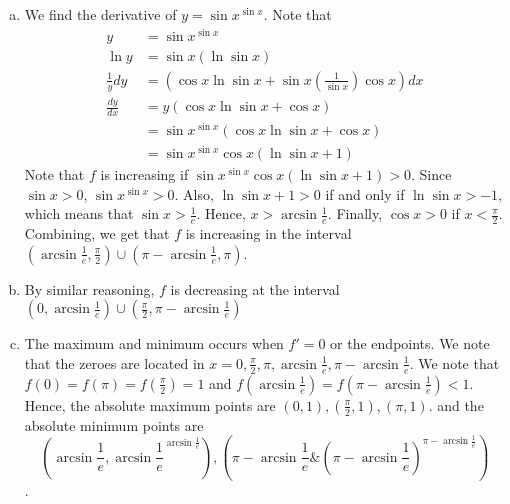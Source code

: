 \documentclass[12pt,a4paper]{article}
\begin{document}
\begin{enumerate}[a.]
    \item We find the derivative of $y = \sin{x}^{\sin{x}}$. 
    Note that \begin{align*}
        y &= \sin{x}^{\sin{x}} \\
        \ln{y} &= \sin{x} (\ln{\sin{x}}) \\
        \frac{1}{y} dy &= (\cos{x} \ln{\sin{x}}+ \sin{x}\left( \frac{1}{\sin{x}} \right) \cos{x}) dx \\
        \frac{dy}{dx} &= y(\cos{x} \ln{\sin{x}}+\cos{x}) \\
        &= \sin{x}^{\sin{x}} (\cos{x} \ln{\sin{x}}+\cos{x}) \\ 
        &= \sin{x}^{\sin{x}} \cos{x} (\ln{\sin{x}}+1)
    \end{align*}
    Note that $f$ is increasing if $\sin{x}^{\sin{x}} \cos{x} (\ln{\sin{x}}+1) > 0$. Since $\sin{x} > 0$, $\sin{x}^{\sin{x}} >0$. Also, $\ln{\sin{x}}+1 >0$ if and only if $\ln{\sin{x}} > -1$, which means that $\sin{x} > \frac{1}{e}$. Hence, $x > \arcsin{\frac{1}{e}}$. Finally, $\cos{x} >0$ if $x < \frac{\pi}{2}$. Combining, we get that $f$ is increasing in the interval $(\arcsin{\frac{1}{e}},\frac{\pi}{2}) \cup (\pi-\arcsin{\frac{1}{e}},\pi)$.
    \item By similar reasoning, $f$ is decreasing at the interval $(0,\arcsin{\frac{1}{e}}) \cup (\frac{\pi}{2},\pi-\arcsin{\frac{1}{e}})$
    \item The maximum and minimum occurs when $f' = 0$ or the endpoints. We note that the zeroes are located in $x=0,\frac{\pi}{2},\pi,\arcsin{\frac{1}{e}},\pi-\arcsin{\frac{1}{e}}$. We note that $f(0)=f(\pi)=f(\frac{\pi}{2}) = 1$ and $f(\arcsin{\frac{1}{e}}) = f(\pi - \arcsin{\frac{1}{e}}) < 1$. Hence, the absolute maximum points are $(0,1),(\frac{\pi}{2},1),(\pi,1)$. and the absolute minimum points are $$\left( \arcsin{\frac{1}{e}}, {\arcsin{\frac{1}{e}}}^{\arcsin{\frac{1}{e}}} \right), \left( \pi-\arcsin{\frac{1}{e}} \& { \left( \pi-\arcsin{\frac{1}{e}} \right) }^{\pi- \arcsin{\frac{1}{e}}} \right)$$.
    \end{enumerate}
\end{document}
